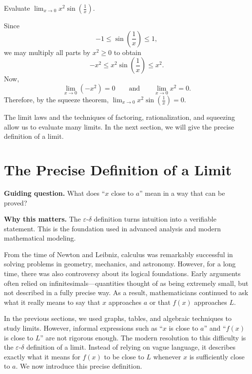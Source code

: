 \begin{example}
Evaluate
\(\displaystyle
\lim_{x\to 0}x^{2}\sin\left(\frac{1}{x}\right).
\)
\end{example}

\begin{solution}
Since
\[
-1\le \sin\left(\frac{1}{x}\right)\le 1,
\]
we may multiply all parts by \(x^{2}\ge 0\) to obtain
\[
-x^{2}\le x^{2}\sin\left(\frac{1}{x}\right)\le x^{2}.
\]
Now,
\[
\lim_{x\to 0}(-x^{2})=0
\qquad \text{and} \qquad
\lim_{x\to 0}x^{2}=0.
\]
Therefore, by the squeeze theorem,
\(\displaystyle
\lim_{x\to 0}x^{2}\sin\left(\frac{1}{x}\right)=0.
\)
\end{solution}

The limit laws and the techniques of factoring, rationalization, and squeezing allow us to evaluate many limits. In the next section, we will give the precise definition of a limit.

\section{The Precise Definition of a Limit}

\begin{remark}
\textbf{Guiding question.} What does ``\(x\) close to \(a\)'' mean in a way that can be proved?

\textbf{Why this matters.} The \(\varepsilon\)-\(\delta\) definition turns intuition into a verifiable statement. This is the foundation used in advanced analysis and modern mathematical modeling.
\end{remark}

From the time of Newton and Leibniz, calculus was remarkably successful in solving problems in geometry, mechanics, and astronomy. However, for a long time, there was also controversy about its logical foundations. Early arguments often relied on infinitesimals---quantities thought of as being extremely small, but not described in a fully precise way. As a result, mathematicians continued to ask what it really means to say that \(x\) approaches \(a\) or that \(f(x)\) approaches \(L\).

In the previous sections, we used graphs, tables, and algebraic techniques to study limits. However, informal expressions such as ``\(x\) is close to \(a\)'' and ``\(f(x)\) is close to \(L\)'' are not rigorous enough. The modern resolution to this difficulty is the \(\varepsilon\)-\(\delta\) definition of a limit. Instead of relying on vague language, it describes exactly what it means for \(f(x)\) to be close to \(L\) whenever \(x\) is sufficiently close to \(a\). We now introduce this precise definition.

